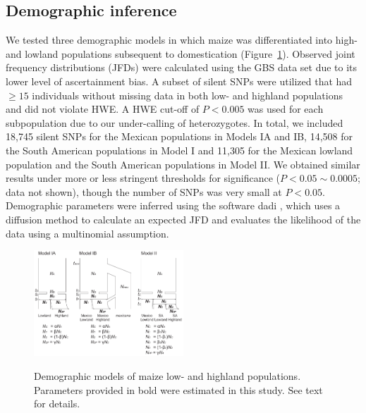 \subsection*{Demographic inference}
We tested three demographic models in which maize was differentiated into high- and lowland populations subsequent to domestication (Figure~\ref{model}). 
Observed joint frequency distributions (JFDs) were calculated using the GBS data set due to its lower level of ascertainment bias. 
A subset of silent SNPs were utilized that had $\geq15$ individuals without missing data in both low- and highland populations and did not violate HWE.  
A HWE cut-off of $P<0.005$ was used for each subpopulation due to our under-calling of heterozygotes. 
In total, we included 18,745 silent SNPs for the Mexican populations in Models IA and IB, 14,508 for the South American populations in Model I and 11,305 for the Mexican lowland population and the South American populations in Model II.  
We obtained similar results under more or less stringent thresholds for significance ($P < 0.05\sim0.0005$; data not shown), though the number of SNPs was very small at $P<0.05$.  
Demographic parameters were inferred using the software {\sf dadi} \cite[]{Gutenkunst_2009_19851460},
which uses a diffusion method to calculate an expected JFD 
and evaluates the likelihood of the data using a multinomial assumption.

\begin{figure}[tb]   
  \begin{center}
   \vspace{-0mm}
   \includegraphics[width=0.5\textwidth]{fig/Fig3}
   \renewcommand{\baselinestretch}{0.9}
   \vspace{-3mm}
   \caption{ Demographic models of maize low- and highland populations.  Parameters provided in bold were estimated in this study.  See text for details.
   }
\vspace{-6mm}
    \label{model}
  \end{center}
\end{figure}

